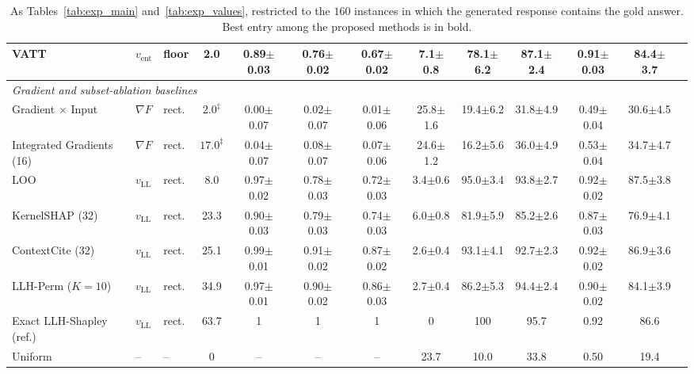 \begin{table}[t]
{\begin{tabular}{lllcccccccccc}
VATT & $v_{\mathrm{ent}}$ & floor & 2.0 & 0.89{\scriptsize$\pm$0.03} & 0.76{\scriptsize$\pm$0.02} & 0.67{\scriptsize$\pm$0.02} & 7.1{\scriptsize$\pm$0.8} & 78.1{\scriptsize$\pm$6.2} & 87.1{\scriptsize$\pm$2.4} & 0.91{\scriptsize$\pm$0.03} & 84.4{\scriptsize$\pm$3.7} \\
\midrule
\multicolumn{12}{l}{\emph{Gradient and subset-ablation baselines}} \\
Gradient $\times$ Input & $\nabla F$ & rect. & $2.0^\ddagger$ & 0.00{\scriptsize$\pm$0.07} & 0.02{\scriptsize$\pm$0.07} & 0.01{\scriptsize$\pm$0.06} & 25.8{\scriptsize$\pm$1.6} & 19.4{\scriptsize$\pm$6.2} & 31.8{\scriptsize$\pm$4.9} & 0.49{\scriptsize$\pm$0.04} & 30.6{\scriptsize$\pm$4.5} \\
Integrated Gradients (16) & $\nabla F$ & rect. & $17.0^\ddagger$ & 0.04{\scriptsize$\pm$0.07} & 0.08{\scriptsize$\pm$0.07} & 0.07{\scriptsize$\pm$0.06} & 24.6{\scriptsize$\pm$1.2} & 16.2{\scriptsize$\pm$5.6} & 36.0{\scriptsize$\pm$4.9} & 0.53{\scriptsize$\pm$0.04} & 34.7{\scriptsize$\pm$4.7} \\
LOO & $v_{\mathrm{LL}}$ & rect. & 8.0 & 0.97{\scriptsize$\pm$0.02} & 0.78{\scriptsize$\pm$0.03} & 0.72{\scriptsize$\pm$0.03} & 3.4{\scriptsize$\pm$0.6} & 95.0{\scriptsize$\pm$3.4} & 93.8{\scriptsize$\pm$2.7} & 0.92{\scriptsize$\pm$0.02} & 87.5{\scriptsize$\pm$3.8} \\
KernelSHAP (32) & $v_{\mathrm{LL}}$ & rect. & 23.3 & 0.90{\scriptsize$\pm$0.03} & 0.79{\scriptsize$\pm$0.03} & 0.74{\scriptsize$\pm$0.03} & 6.0{\scriptsize$\pm$0.8} & 81.9{\scriptsize$\pm$5.9} & 85.2{\scriptsize$\pm$2.6} & 0.87{\scriptsize$\pm$0.03} & 76.9{\scriptsize$\pm$4.1} \\
ContextCite (32) & $v_{\mathrm{LL}}$ & rect. & 25.1 & 0.99{\scriptsize$\pm$0.01} & 0.91{\scriptsize$\pm$0.02} & 0.87{\scriptsize$\pm$0.02} & 2.6{\scriptsize$\pm$0.4} & 93.1{\scriptsize$\pm$4.1} & 92.7{\scriptsize$\pm$2.3} & 0.92{\scriptsize$\pm$0.02} & 86.9{\scriptsize$\pm$3.6} \\
LLH-Perm ($K=10$) & $v_{\mathrm{LL}}$ & rect. & 34.9 & 0.97{\scriptsize$\pm$0.01} & 0.90{\scriptsize$\pm$0.02} & 0.86{\scriptsize$\pm$0.03} & 2.7{\scriptsize$\pm$0.4} & 86.2{\scriptsize$\pm$5.3} & 94.4{\scriptsize$\pm$2.4} & 0.90{\scriptsize$\pm$0.02} & 84.1{\scriptsize$\pm$3.9} \\
\midrule
Exact LLH-Shapley (ref.) & $v_{\mathrm{LL}}$ & rect. & 63.7 & 1 & 1 & 1 & 0 & 100 & 95.7 & 0.92 & 86.6 \\
Uniform & -- & -- & 0 & -- & -- & -- & 23.7 & 10.0 & 33.8 & 0.50 & 19.4 \\
\bottomrule
\end{tabular}%
}
\caption{As Tables~\ref{tab:exp_main} and~\ref{tab:exp_values}, restricted to the $160$ instances in which the generated response contains the gold answer. Best entry among the proposed methods is in bold.}
\label{tab:exp_correct}
\end{table}


